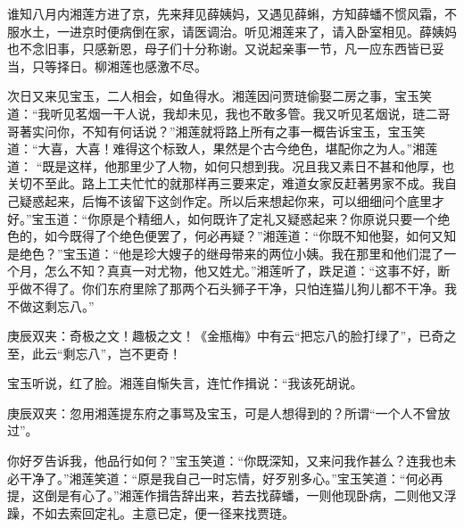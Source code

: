 \begin{parag}
    谁知八月内湘莲方进了京，先来拜见薛姨妈，又遇见薛蝌，方知薛蟠不惯风霜，不服水土，一进京时便病倒在家，请医调治。听见湘莲来了，请入卧室相见。薛姨妈也不念旧事，只感新恩，母子们十分称谢。又说起亲事一节，凡一应东西皆已妥当，只等择日。柳湘莲也感激不尽。
\end{parag}


\begin{parag}
    次日又来见宝玉，二人相会，如鱼得水。湘莲因问贾琏偷娶二房之事，宝玉笑道：“我听见茗烟一干人说，我却未见，我也不敢多管。我又听见茗烟说，琏二哥哥著实问你，不知有何话说？”湘莲就将路上所有之事一概告诉宝玉，宝玉笑道：“大喜，大喜！难得这个标致人，果然是个古今绝色，堪配你之为人。”湘莲道： “既是这样，他那里少了人物，如何只想到我。况且我又素日不甚和他厚，也关切不至此。路上工夫忙忙的就那样再三要来定，难道女家反赶著男家不成。我自己疑惑起来，后悔不该留下这剑作定。所以后来想起你来，可以细细问个底里才好。”宝玉道：“你原是个精细人，如何既许了定礼又疑惑起来？你原说只要一个绝色的，如今既得了个绝色便罢了，何必再疑？”湘莲道：“你既不知他娶，如何又知是绝色？”宝玉道：“他是珍大嫂子的继母带来的两位小姨。我在那里和他们混了一个月，怎么不知？真真一对尤物，他又姓尤。”湘莲听了，跌足道：“这事不好，断乎做不得了。你们东府里除了那两个石头狮子干净，只怕连猫儿狗儿都不干净。我不做这剩忘八。”\begin{note}庚辰双夹：奇极之文！趣极之文！《金瓶梅》中有云“把忘八的脸打绿了”，已奇之至，此云“剩忘八”，岂不更奇！\end{note}宝玉听说，红了脸。湘莲自惭失言，连忙作揖说：“我该死胡说。\begin{note}庚辰双夹：忽用湘莲提东府之事骂及宝玉，可是人想得到的？所谓“一个人不曾放过”。\end{note}你好歹告诉我，他品行如何？”宝玉笑道：“你既深知，又来问我作甚么？连我也未必干净了。”湘莲笑道：“原是我自己一时忘情，好歹别多心。”宝玉笑道：“何必再提，这倒是有心了。”湘莲作揖告辞出来，若去找薛蟠，一则他现卧病，二则他又浮躁，不如去索回定礼。主意已定，便一径来找贾琏。
\end{parag}


